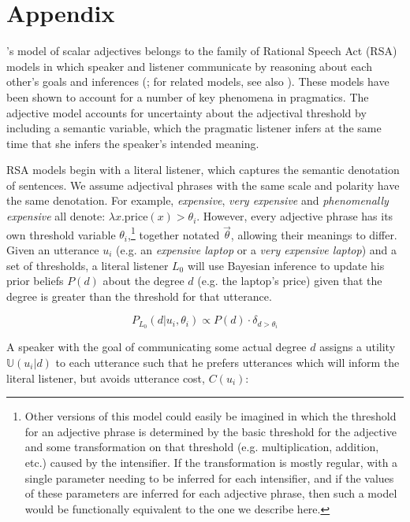 \documentclass[10pt,letterpaper]{article}
\newcommand{\w}[1]{\emph{#1}}
\begin{document}
\section{Appendix} \label{app:model}

 's model of scalar adjectives belongs to the family of Rational Speech Act (RSA) models in which speaker and listener communicate by  reasoning about each other's goals and inferences (; for related models, see also ). 
 These models have been shown to account for a number of key phenomena in pragmatics. The adjective model accounts for uncertainty about the adjectival threshold by including a semantic variable, which the pragmatic listener infers at the same time that she infers the speaker's intended meaning. 

RSA models begin with a literal listener, which captures the semantic denotation of sentences. 
We assume adjectival phrases with the same scale and polarity have the same denotation. For example, \w{expensive}, \w{very expensive} and \w{phenomenally expensive} all denote: $\lambda x . \text{price}(x) > \theta_i$. %
However, every adjective phrase has its own threshold variable $\theta_i$,\footnote{Other versions of this model could easily be imagined in which the threshold for an adjective phrase is determined by the basic threshold for the adjective and some transformation on that threshold (e.g. multiplication, addition, etc.) caused by the intensifier. If the transformation is mostly regular, with a single parameter needing to be inferred for each intensifier, and if the values of these parameters are inferred for each adjective phrase, then such a model would be functionally equivalent to the one we describe here.} together notated $\vec{\theta}$, allowing their meanings to differ.
Given an utterance $u_i$ (e.g. an \w{expensive laptop} or a \w{very expensive laptop}) and a set of thresholds, a literal listener $L_0$ will use Bayesian inference to update his prior beliefs $P(d)$ about the degree $d$ (e.g. the laptop's price) given that the degree is greater than the threshold for that utterance.

$$P_{L_0}(d|u_i, \theta_i) \propto P(d) \cdot \delta_{d > \theta_i}$$

A speaker with the goal of communicating some actual degree $d$ assigns a utility $\mathbb{U}(u_i|d)$ to each utterance such that he prefers utterances which will inform the literal listener, but avoids utterance cost, $C(u_i)$:
\end{document}
